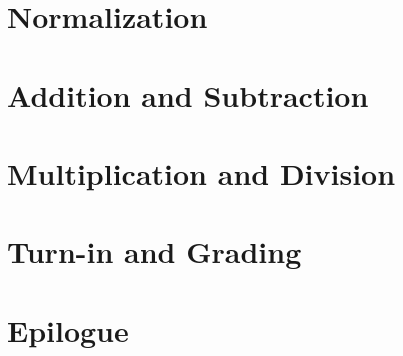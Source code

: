     \section{Normalization}                                             

    \section{Addition and Subtraction}                                  

    \section{Multiplication and Division}                               

    \section{Turn-in and Grading}                                       

    \section*{Epilogue}                                                 \GoingBackToTheZoo


